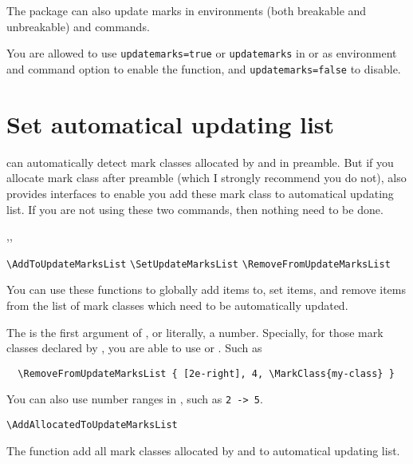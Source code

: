\documentclass{l3doc}
\begin{document}
\section{}

The  package can also update marks in  environments
(both breakable and unbreakable) and  commands.

You are allowed to use \verb|updatemarks=true| or \verb|updatemarks| in 
or as environment and command option to enable the function, and 
\verb|updatemarks=false| to disable.


\section{Set automatical updating list}

 can automatically detect mark classes allocated by 
and  in preamble. But if you allocate mark class after preamble
(which I strongly recommend you do not),
 also provides interfaces to enable you add these mark class to 
automatical updating list. If you are not using these two commands, then nothing need 
to be done.


\begin{function}{\AddToUpdateMarksList,\SetUpdateMarksList,\RemoveFromUpdateMarksList}
  \begin{syntax}
    \verb|\AddToUpdateMarksList|      
    \verb|\SetUpdateMarksList|        
    \verb|\RemoveFromUpdateMarksList| 
  \end{syntax}
You can use these functions to globally add items to, set items, and remove items from 
the list of mark classes which need to be automatically updated.

The  is the first argument of , or literally, a number.
Specially, for those mark classes declared by , you are able to use 
 or . Such as 
\begin{verbatim}
  \RemoveFromUpdateMarksList { [2e-right], 4, \MarkClass{my-class} }
\end{verbatim}
You can also use number ranges in , such as \verb|2 -> 5|.
\end{function}


\begin{function}{\AddAllocatedToUpdateMarksList}
  \begin{syntax}
    \verb|\AddAllocatedToUpdateMarksList|
  \end{syntax}
The function add all mark classes allocated by  and 
to automatical updating list.
\end{function}
\end{document}
